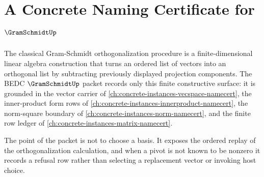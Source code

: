 \chapter{A Concrete Naming Certificate for $\GramSchmidtUp$}
\label{ch:concrete-instances-gram-schmidt-namecert}

The classical Gram-Schmidt orthogonalization procedure is a finite-dimensional linear algebra construction that turns an ordered list of vectors into an orthogonal list by subtracting previously displayed projection components. The BEDC $\GramSchmidtUp$ packet records only this finite constructive surface: it is grounded in the vector carrier of \autoref{ch:concrete-instances-vecspace-namecert}, the inner-product form rows of \autoref{ch:concrete-instances-innerproduct-namecert}, the norm-square boundary of \autoref{ch:concrete-instances-norm-namecert}, and the finite row ledger of \autoref{ch:concrete-instances-matrix-namecert}.

The point of the packet is not to choose a basis. It exposes the ordered replay of the orthogonalization calculation, and when a pivot is not known to be nonzero it records a refusal row rather than selecting a replacement vector or invoking host choice.

